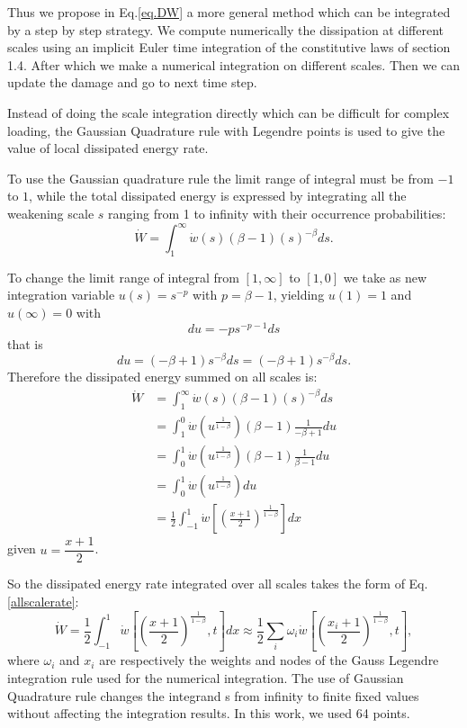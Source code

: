 \documentclass[3p,times,number,review]{elsarticle}
\begin{document}
Thus we propose in Eq.\eqref{eq.DW} a more general method which can be integrated by a step by step strategy. We compute numerically the dissipation at different scales using an implicit Euler time integration of the constitutive laws of section 1.4. After which we make a numerical integration on different scales. Then we can update the damage and go to next time step. 

Instead of doing the scale integration directly which can be difficult for complex loading, the Gaussian Quadrature rule with Legendre points is used to give the value of local dissipated energy rate.

To use the Gaussian quadrature rule the limit range of integral must be from $-1$ to $1$, while the total dissipated energy  is expressed by integrating all the weakening scale $s$ ranging from 1 to infinity with their occurrence probabilities:
$$\dot{W}=\int_{1}^{\infty}\dot{w}(s) (\beta-1)(s)^{-\beta}ds.$$

\noindent
To change the limit range of integral from $[1,\infty]$ to $[1,0]$ we take as new integration variable
$u(s)= s^{-p}$ with $p=\beta-1$, yielding $u(1)=1$ and  $u(\infty)=0$ with
$$du=-ps^{-p-1}ds$$ 
that is
$$du=(-\beta+1) s^{-\beta}ds=(-\beta+1)s^{-\beta} ds.$$
Therefore the dissipated energy summed on all scales is:
\begin{equation}
\begin{split}
\dot{W}&=\int_{1}^{\infty}\dot{w}(s) (\beta-1)(s)^{-\beta}ds
\\&=\int_{1}^{0}\dot{w}\left( u^{\frac{1}{1-\beta}}\right) (\beta-1) \frac{1}{-\beta+1}du
\\&=\int_{0}^{1}\dot{w}\left( u^{\frac{1}{1-\beta}}\right) (\beta-1) \frac{1}{\beta-1}du
\\&=\int_{0}^{1}\dot{w}\left( u^{\frac{1}{1-\beta}}\right)du
\\&=\frac{1}{2}\int_{-1}^{1}\dot{w}\left[  \left( \frac{x+1}{2}\right) ^{\frac{1}{1-\beta}}\right] dx
\end{split}
\label{allscale}
\end{equation}
given $u=\dfrac{x+1}{2}$.

So the dissipated energy rate integrated over all scales takes the form of Eq.\eqref{allscalerate}:
\begin{equation}
\dot{W}=\frac{1}{2}\int_{-1}^{1}\dot{w}\left[  \left( \frac{x+1}{2}\right) ^{\frac{1}{1-\beta}},t\right] dx\approx\frac{1}{2}\sum_{i}\omega_i\dot{w}\left[  \left( \frac{x_i+1}{2}\right) ^{\frac{1}{1-\beta}},t\right],
\label{allscalerate}
\end{equation}
where $\omega_i$ and $x_i$ are respectively the weights and nodes of the Gauss Legendre integration rule used for the numerical integration. The use of Gaussian Quadrature rule changes the integrand s from infinity to finite fixed values without affecting the integration results. In this work, we used 64 points\cite{legendre}.
\end{document}
